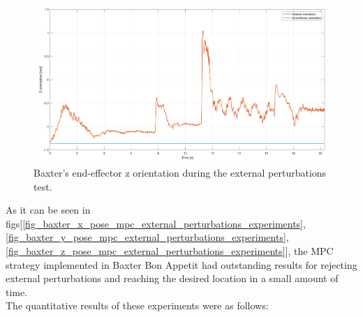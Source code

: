 \documentclass[11pt]{report} %
\begin{document}
\begin{figure}[H]
    \centering
    \includegraphics[width=1.0\linewidth]{assets/imgs/control_theory/mpc_regulation_external_perturbations/z_orientation.png}
    \caption{Baxter's end-effector z orientation during the external perturbations test.} 
    \label{fig_baxter_z_orientation_mpc_external_perturbations_experiments}
\end{figure}

As it can be seen in figs[\ref{fig_baxter_x_pose_mpc_external_perturbations_experiments}, \ref{fig_baxter_y_pose_mpc_external_perturbations_experiments}, \ref{fig_baxter_z_pose_mpc_external_perturbations_experiments}], the MPC strategy implemented in Baxter Bon Appetit had outstanding results for rejecting external perturbations and reaching the desired location in a small amount of time.\\

The quantitative results of these experiments were as follows:

\begin{table}[H]
\begin{center}
\caption{\label{tab:performance_metrics_external_perturbations} Performance metrics for regulation experiment with external perturbations.}
\end{center}
\end{table}


\end{document}
